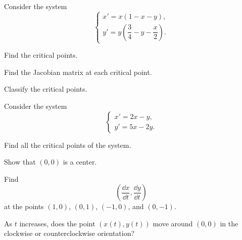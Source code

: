 \begin{problem}
Consider the system
\[
\begin{cases}
x'=x(1-x-y),\\[0.2em]
y'=y\left(\dfrac34-y-\dfrac x2\right).
\end{cases}
\]
\begin{problemsubparts}
\item Find the critical points.
\item Find the Jacobian matrix at each critical point.
\item Classify the critical points.
\end{problemsubparts}
\end{problem}

\begin{problem}
Consider the system
\[
\begin{cases}
x'=2x-y,\\
y'=5x-2y.
\end{cases}
\]
\begin{problemsubparts}
\item Find all the critical points of the system.
\item Show that $(0,0)$ is a center.
\item Find
\[
\left(\frac{\dd x}{\dd t},\frac{\dd y}{\dd t}\right)
\]
at the points $(1,0)$, $(0,1)$, $(-1,0)$, and $(0,-1)$.
\item As $t$ increases, does the point $(x(t),y(t))$ move around $(0,0)$ in the clockwise or counterclockwise orientation?
\end{problemsubparts}
\end{problem}

